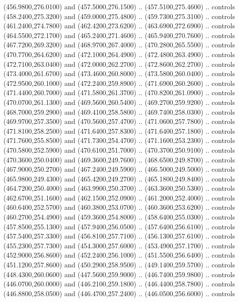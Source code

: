 {\begin{scope}[y=0.80pt, x=0.80pt, yscale=-1, xscale=1, inner sep=0pt, outer sep=0pt, #1]
      (456.9800,276.0100) and (457.5000,276.1500) .. (457.5100,275.4600) .. controls
      (458.2400,275.3200) and (459.0000,275.4800) .. (459.7300,275.3100) .. controls
      (461.2400,274.7800) and (462.4200,273.6200) .. (463.6900,272.6900) .. controls
      (464.5500,272.1700) and (465.2400,271.4600) .. (465.9400,270.7600) .. controls
      (467.7200,269.3200) and (468.9700,267.4000) .. (470.2800,265.5500) .. controls
      (470.7700,264.6200) and (472.1000,264.4900) .. (472.4800,263.4900) .. controls
      (472.7100,263.0400) and (472.0000,262.2700) .. (472.8600,262.2700) .. controls
      (473.4000,261.6700) and (473.4600,260.8000) .. (473.5800,260.0400) .. controls
      (472.9500,260.1000) and (472.2400,259.8900) .. (471.6900,260.2600) .. controls
      (471.4400,260.7000) and (471.5800,261.3700) .. (470.8200,261.0900) .. controls
      (470.0700,261.1300) and (469.5600,260.5400) .. (469.2700,259.9200) .. controls
      (468.7000,259.2900) and (469.4100,258.5800) .. (469.7400,258.0300) .. controls
      (469.9700,257.3500) and (470.5600,257.4700) .. (471.0600,257.7800) .. controls
      (471.8100,258.2500) and (471.6400,257.8300) .. (471.6400,257.1800) .. controls
      (471.7600,255.8500) and (471.7300,254.4700) .. (471.1600,253.2300) .. controls
      (470.5800,252.5900) and (470.6100,251.7000) .. (470.3700,250.9100) .. controls
      (470.3600,250.0400) and (469.3600,249.7600) .. (468.6500,249.8700) .. controls
      (467.9000,250.2700) and (467.2400,249.5900) .. (466.5000,249.5000) .. controls
      (465.9800,249.4300) and (465.4200,249.2700) .. (465.1800,249.8400) .. controls
      (464.7200,250.4000) and (463.9900,250.3700) .. (463.3600,250.5300) .. controls
      (462.6700,251.1600) and (462.1500,252.0900) .. (461.2000,252.4000) .. controls
      (460.6400,252.5700) and (460.3800,253.0700) .. (460.3600,253.6200) .. controls
      (460.2700,254.4900) and (459.3600,254.8000) .. (458.6400,255.0300) .. controls
      (457.8500,255.1300) and (457.9400,256.0500) .. (457.6400,256.6100) .. controls
      (457.5400,257.3300) and (456.8100,257.7100) .. (456.1300,257.6100) .. controls
      (455.2300,257.7300) and (454.3000,257.6000) .. (453.4900,257.1700) .. controls
      (452.9000,256.8600) and (452.2400,256.1000) .. (451.5500,256.6400) .. controls
      (451.1200,257.8600) and (450.2900,258.9500) .. (449.1400,259.5700) .. controls
      (448.4300,260.0600) and (447.5600,259.9000) .. (446.7400,259.9800) .. controls
      (446.0700,260.0000) and (446.2100,259.1800) .. (446.4400,258.7800) .. controls
      (446.8800,258.0500) and (446.4700,257.2400) .. (446.0500,256.6000) .. controls

\end{scope}}
